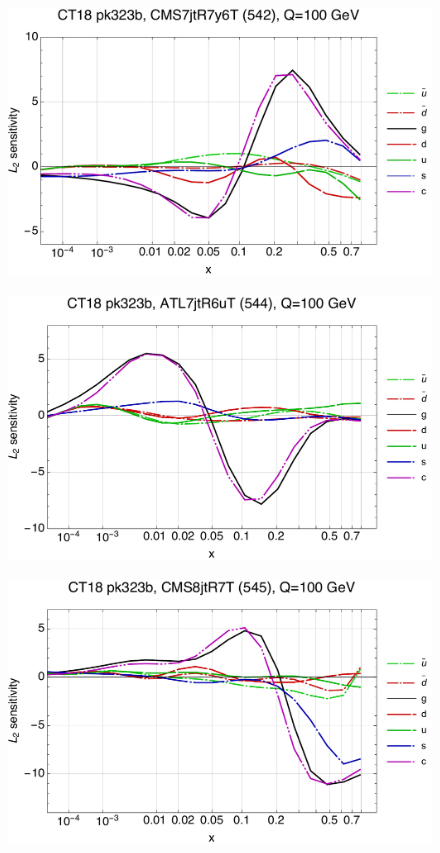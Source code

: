 \documentclass[10pt,aps,prd,floatfix,titlepage]{revtex4}
\begin{document}
\begin{figure}
\includegraphics[width=\textwidth,height=0.44\textheight,keepaspectratio]{1/542_ct18nn_L2_q100_Sf_1.pdf}
\caption{}
\end{figure}
\clearpage
\begin{figure}
\includegraphics[width=\textwidth,height=0.44\textheight,keepaspectratio]{1/544_ct18nn_L2_q100_Sf_1.pdf}
\caption{}
\end{figure}
\begin{figure}
\includegraphics[width=\textwidth,height=0.44\textheight,keepaspectratio]{1/545_ct18nn_L2_q100_Sf_1.pdf}
\caption{}
\end{figure}
\end{document}
